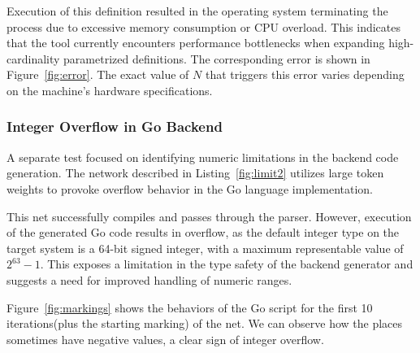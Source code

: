 \documentclass[12pt]{article}
\begin{document}
            Execution of this definition resulted in the operating system terminating the process due to excessive memory consumption or CPU overload. This indicates that the tool currently encounters performance bottlenecks when expanding high-cardinality parametrized definitions. The corresponding error is shown in Figure~\ref{fig:error}. The exact value of $N$ that triggers this error varies depending on the machine's hardware specifications.

        \subsubsection{Integer Overflow in Go Backend}
            A separate test focused on identifying numeric limitations in the backend code generation. The network described in Listing~\ref{fig:limit2} utilizes large token weights to provoke overflow behavior in the Go language implementation.

            This net successfully compiles and passes through the parser. However, execution of the generated Go code results in overflow, as the default integer type on the target system is a 64-bit signed integer, with a maximum representable value of $2^{63} - 1$. This exposes a limitation in the type safety of the backend generator and suggests a need for improved handling of numeric ranges.

            Figure~\ref{fig:markings} shows the behaviors of the Go script for the first 10 iterations(plus the starting marking) of the net. We can observe how the places sometimes have negative values, a clear sign of integer overflow.


\end{document}
